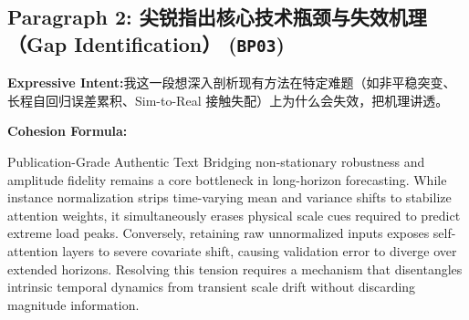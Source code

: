 \subsection*{Paragraph 2: 尖锐指出核心技术瓶颈与失效机理（Gap Identification） (\texttt{BP03})}
\noindent\textbf{Expressive Intent:}\enspace 我这一段想深入剖析现有方法在特定难题（如非平稳突变、长程自回归误差累积、Sim-to-Real 接触失配）上为什么会失效，把机理讲透。\par
\noindent\textbf{Cohesion Formula:}\par\vspace{4pt}
\begin{ExampleBox}{Publication-Grade Authentic Text}
Bridging non-stationary robustness and amplitude fidelity remains a core bottleneck in long-horizon forecasting. While instance normalization strips time-varying mean and variance shifts to stabilize attention weights, it simultaneously erases physical scale cues required to predict extreme load peaks. Conversely, retaining raw unnormalized inputs exposes self-attention layers to severe covariate shift, causing validation error to diverge over extended horizons. Resolving this tension requires a mechanism that disentangles intrinsic temporal dynamics from transient scale drift without discarding magnitude information.
\end{ExampleBox}
